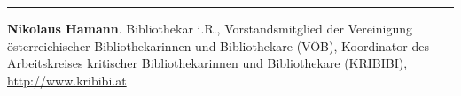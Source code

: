 \documentclass[a4paper,
fontsize=11pt,
oneside,
numbers=noperiodatend,
parskip=half-,
bibliography=totoc,
final
]{scrartcl}
\begin{document}
\begin{center}\rule{0.5\linewidth}{\linethickness}\end{center}

\textbf{Nikolaus Hamann}. Bibliothekar i.R., Vorstandsmitglied der
Vereinigung österreichischer Bibliothekarinnen und Bibliothekare (VÖB),
Koordinator des Arbeitskreises kritischer Bibliothekarinnen und
Bibliothekare (KRIBIBI), \url{http://www.kribibi.at}
\end{document}
